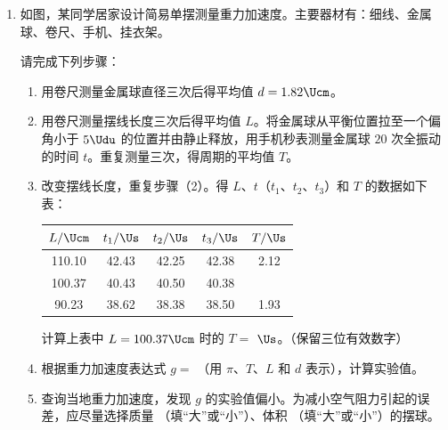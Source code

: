 \documentclass[\gkver]{gaokaozhenti}
\begin{document}
\begin{enumerate}
{由功能关系有产生的焦耳热 $Q=|W|$

联立解得 $Q=\frac{B^{2}d^{2}v_{0}\tan^{2}\beta}{r\tan\alpha}$，故 D 错误。

故选 AC。
}
\item
如图，某同学居家设计简易单摆测量重力加速度。主要器材有：细线、金属球、卷尺、手机、挂衣架。

请完成下列步骤：
\onepicture[h=4.0cm, align=right]{}
\begin{enumerate}
	\item
	用卷尺测量金属球直径三次后得平均值 $d=1.82\Ucm$。
	\item
	用卷尺测量摆线长度三次后得平均值 $L$。将金属球从平衡位置拉至一个偏角小于 $5\Udu$ 的位置并由静止释放，用手机秒表测量金属球 $20$ 次全振动的时间 $t$。重复测量三次，得周期的平均值 $T$。
	\item
	改变摆线长度，重复步骤（2）。得 $L$、$t$（$t_{1}$、$t_{2}$、$t_{3}$）和 $T$ 的数据如下表：

	\begin{center}
	\begin{tabular}{|c|c|c|c|c|}
	\hline
	$L/\Ucm$ & $t_{1}/\Us$ & $t_{2}/\Us$ & $t_{3}/\Us$ & $T/\Us$ \\ \hline
	110.10 & 42.43 & 42.25 & 42.38 & 2.12 \\ \hline
	100.37 & 40.43 & 40.50 & 40.38 &  \\ \hline
	90.23 & 38.62 & 38.38 & 38.50 & 1.93 \\ \hline
	\end{tabular}
	\end{center}

	计算上表中 $L=100.37\Ucm$ 时的 $T=$  $\Us$。（保留三位有效数字）
	\item
	根据重力加速度表达式 $g=$ （用 $\pi$、$T$、$L$ 和 $d$ 表示），计算实验值。
	\item
	查询当地重力加速度，发现 $g$ 的实验值偏小。为减小空气阻力引起的误差，应尽量选择质量 （填“大”或“小”）、体积 （填“大”或“小”）的摆球。
\end{enumerate}

\end{enumerate}
\end{document}
